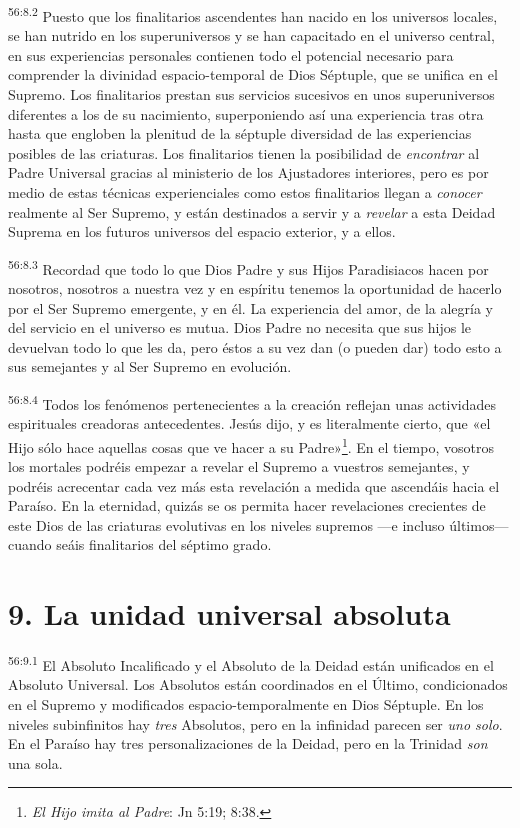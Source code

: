 \par
\textsuperscript{56:8.2} Puesto que los finalitarios ascendentes han nacido en los universos locales, se han nutrido en los superuniversos y se han capacitado en el universo central, en sus experiencias personales contienen todo el potencial necesario para comprender la divinidad espacio-temporal de Dios Séptuple, que se unifica en el Supremo. Los finalitarios prestan sus servicios sucesivos en unos superuniversos diferentes a los de su nacimiento, superponiendo así una experiencia tras otra hasta que engloben la plenitud de la séptuple diversidad de las experiencias posibles de las criaturas. Los finalitarios tienen la posibilidad de \textit{encontrar} al Padre Universal gracias al ministerio de los Ajustadores interiores, pero es por medio de estas técnicas experienciales como estos finalitarios llegan a \textit{conocer} realmente al Ser Supremo, y están destinados a servir y a \textit{revelar} a esta Deidad Suprema en los futuros universos del espacio exterior, y a ellos.

\par
\textsuperscript{56:8.3} Recordad que todo lo que Dios Padre y sus Hijos Paradisiacos hacen por nosotros, nosotros a nuestra vez y en espíritu tenemos la oportunidad de hacerlo por el Ser Supremo emergente, y en él. La experiencia del amor, de la alegría y del servicio en el universo es mutua. Dios Padre no necesita que sus hijos le devuelvan todo lo que les da, pero éstos a su vez dan (o pueden dar) todo esto a sus semejantes y al Ser Supremo en evolución.

\par
\textsuperscript{56:8.4} Todos los fenómenos pertenecientes a la creación reflejan unas actividades espirituales creadoras antecedentes. Jesús dijo, y es literalmente cierto, que «el Hijo sólo hace aquellas cosas que ve hacer a su Padre»\footnote{\textit{El Hijo imita al Padre}: Jn 5:19; 8:38.}. En el tiempo, vosotros los mortales podréis empezar a revelar el Supremo a vuestros semejantes, y podréis acrecentar cada vez más esta revelación a medida que ascendáis hacia el Paraíso. En la eternidad, quizás se os permita hacer revelaciones crecientes de este Dios de las criaturas evolutivas en los niveles supremos ---e incluso últimos--- cuando seáis finalitarios del séptimo grado.

\section*{9. La unidad universal absoluta}
\par
\textsuperscript{56:9.1} El Absoluto Incalificado y el Absoluto de la Deidad están unificados en el Absoluto Universal. Los Absolutos están coordinados en el Último, condicionados en el Supremo y modificados espacio-temporalmente en Dios Séptuple. En los niveles subinfinitos hay \textit{tres} Absolutos, pero en la infinidad parecen ser \textit{uno solo}. En el Paraíso hay tres personalizaciones de la Deidad, pero en la Trinidad \textit{son} una sola.


